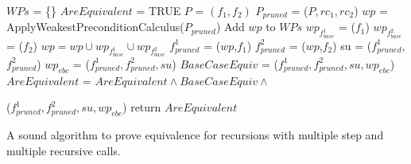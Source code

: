 \begin{algorithm}
\begin{minipage}{\linewidth}
\begin{algorithmic}[1]
	\State $WPs$ = \{\}
	\State $AreEquivalent$ = TRUE
	\State $P$ = $(f_1,f_2)$
	\State $P_{pruned}$ = ($P,rc_1,rc_2$)
	\State $wp$ = ApplyWeakestPreconditionCalculus($P_{pruned}$)
	\State Add $wp$ to $WPs$
	\EndFor
	\EndFor
	\State $wp_{f_{base}^1}$ = ($f_1$) 
	\State $wp_{f_{base}^2}$ = ($f_2$)
	\State $wp = wp\cup wp_{f_{base}^1} \cup wp_{f_{base}^2} $
	\State $f_{pruned}^1$ = ($wp$,$f_1$)
	\State $f_{pruned}^2$ = ($wp$,$f_2$)
	\State su = ($f_{pruned}^1$,$f_{pruned}^2$)
	\State $wp_{ebc}$ = ($f_{pruned}^1,f_{pruned}^2,su$)
	\State $BaseCaseEquiv$ = ($f_{pruned}^1,f_{pruned}^2,su,wp_{ebc}$) 
	\State $AreEquivalent$ = $AreEquivalent \wedge BaseCaseEquiv \wedge$
	
	
	($f_{pruned}^1,f_{pruned}^2,su,wp_{ebc}$) 
	\EndFor
	\State return $AreEquivalent$
	\EndFunction
\end{algorithmic}
\end{minipage}
\caption{A sound algorithm to prove equivalence for recursions with multiple step and multiple recursive calls.}
\label{alg:dvdwp}
\end{algorithm}


